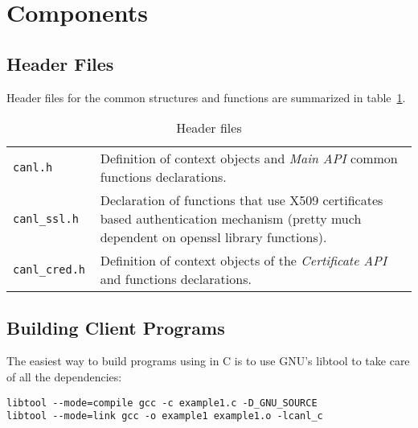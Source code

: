 \section{\CANL Components}
\label{s:common}

\subsection{Header Files}

Header files for the common structures and functions are summarized in
table~\ref{t:cheaders}.

\begin{table}[h]
\begin{tabularx}{\textwidth}{>{\tt}lX}
canl.h & Definition of context objects and \textit{Main API} common 
functions declarations. \\
canl\_ssl.h & Declaration of functions that use X509 certificates 
based authentication mechanism (pretty much dependent on 
openssl library functions).\\
canl\_cred.h & Definition of context objects of the 
\textit{Certificate API}  and  functions declarations.\\
\end{tabularx}
\caption{Header files}
\label{t:cheaders}
\end{table}

\subsection{Building Client Programs}
The easiest way to build programs using \CANL in C is to use
GNU's libtool to take care of all the dependencies:
\begin{verbatim}
libtool --mode=compile gcc -c example1.c -D_GNU_SOURCE
libtool --mode=link gcc -o example1 example1.o -lcanl_c
\end{verbatim}

